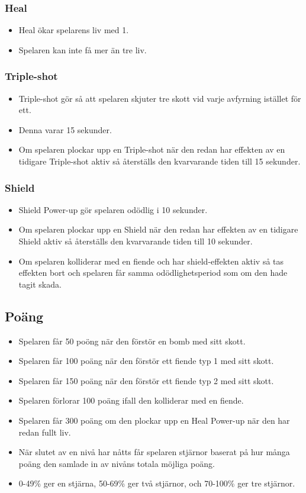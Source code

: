 \documentclass{TDP005mall}
\begin{document}
\subsubsection*{Heal}
\begin{itemize}
\item Heal ökar spelarens liv med 1.
\item Spelaren kan inte få mer än tre liv.
\end{itemize}

\subsubsection*{Triple-shot}
\begin{itemize}
\item Triple-shot gör så att spelaren skjuter tre skott vid varje avfyrning istället för ett.
\item Denna varar 15 sekunder.
\item Om spelaren plockar upp en Triple-shot när den redan har effekten av en tidigare Triple-shot aktiv så återställs den kvarvarande tiden till 15 sekunder.
\end{itemize}

\subsubsection*{Shield}
\begin{itemize}
\item Shield Power-up gör spelaren odödlig i 10 sekunder.
\item Om spelaren plockar upp en Shield när den redan har effekten av en tidigare Shield aktiv så återställs den kvarvarande tiden till 10 sekunder.
\item Om spelaren kolliderar med en fiende och har shield-effekten aktiv så tas effekten bort och spelaren får samma odödlighetsperiod som om den hade tagit skada.  
\end{itemize}


\subsection{Poäng}
\begin{itemize}
\item Spelaren får 50 poöng när den förstör en bomb med sitt skott.
\item Spelaren får 100 poäng när den förstör ett fiende typ 1 med sitt skott.
\item Spelaren får 150 poäng när den förstör ett fiende typ 2 med sitt skott.
\item Spelaren förlorar 100 poäng ifall den kolliderar med en fiende.
\item Spelaren får 300 poäng om den plockar upp en Heal Power-up när den har redan fullt liv.
\item När slutet av en nivå har nåtts får spelaren stjärnor baserat på hur många poäng den samlade in av nivåns totala möjliga poäng.
\item 0-49\% ger en stjärna, 50-69\% ger två stjärnor, och 70-100\% ger tre stjärnor.
\end{itemize}
\end{document}
